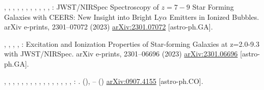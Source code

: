 \documentclass[sn-mathphys]{sn-jnl}%
\theoremstyle{thmstyleone}%
\theoremstyle{thmstyletwo}%
\theoremstyle{thmstylethree}%
\begin{document}
\begin{thebibliography}{125}
\begin{botherref}
,
,
,
,
,
,
,
,
,
,
,
:
{JWST/NIRSpec Spectroscopy of $z=7-9$ Star Forming Galaxies with CEERS: New
  Insight into Bright Ly$\alpha$ Emitters in Ionized Bubbles}.
arXiv e-prints,
2301--07072
(2023)
{\href{https://arxiv.org/abs/2301.07072}{{arXiv:2301.07072}}}
{[astro-ph.GA]}.
\end{botherref}
\endbibitem

\begin{botherref}
,
,
,
,
:
{Excitation and Ionization Properties of Star-forming Galaxies at z=2.0-9.3
  with JWST/NIRSpec}.
arXiv e-prints,
2301--06696
(2023)
{\href{https://arxiv.org/abs/2301.06696}{{arXiv:2301.06696}}}
{[astro-ph.GA]}.
\end{botherref}
\endbibitem

\begin{barticle}
,
,
,
,
,
,
,
,
,
,
,
,
,
,
,
,
:
.
(),
--
()
{\href{https://arxiv.org/abs/0907.4155}{{arXiv:0907.4155}}}
{[astro-ph.CO]}.
\end{barticle}
\endbibitem


\end{thebibliography}
\end{document}
